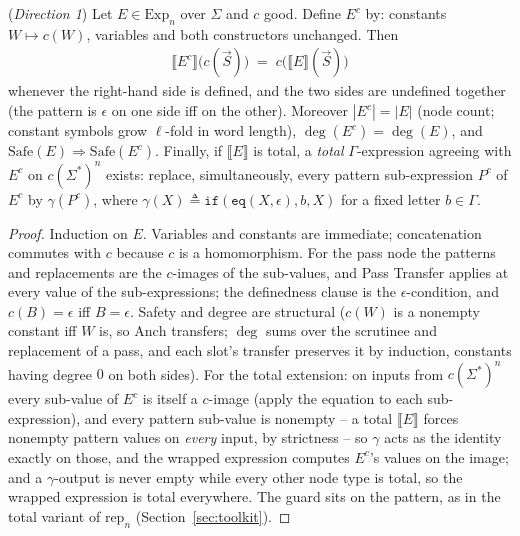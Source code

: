 \documentclass[runningheads,envcountsect]{llncs}
\begin{document}
\begin{theorem}
    (\emph{Direction 1})
    \label{thm:transfer-forward}
    Let $E \in \mathrm{Exp}_n$ over $\Sigma$ and $c$ good. Define $E^c$ by: constants $W \mapsto c(W)$, variables and both constructors unchanged. Then
    \begin{align}
        \llbracket E^c \rrbracket\big(c(\vec S)\big) \;=\; c\big(\llbracket E \rrbracket(\vec S)\big)
    \end{align}
    whenever the right-hand side is defined, and the two sides are undefined together (the pattern is $\epsilon$ on one side iff on the other). Moreover $|E^c| = |E|$ (node count; constant symbols grow $\ell$-fold in word length), $\deg(E^c) = \deg(E)$, and $\mathrm{Safe}(E) \Rightarrow \mathrm{Safe}(E^c)$. Finally, if $\llbracket E \rrbracket$ is total, a \emph{total} $\Gamma$-expression agreeing with $E^c$ on $c(\Sigma^*)^n$ exists: replace, simultaneously, every pattern sub-expression $P^c$ of $E^c$ by $\gamma(P^c)$, where $\gamma(X) \triangleq \mathtt{if}(\mathtt{eq}(X, \epsilon), b, X)$ for a fixed letter $b \in \Gamma$.
\end{theorem}

\begin{proof}
    Induction on $E$. Variables and constants are immediate; concatenation commutes with $c$ because $c$ is a homomorphism. For the pass node the patterns and replacements are the $c$-images of the sub-values, and Pass Transfer applies at every value of the sub-expressions; the definedness clause is the $\epsilon$-condition, and $c(B) = \epsilon$ iff $B = \epsilon$. Safety and degree are structural ($c(W)$ is a nonempty constant iff $W$ is, so $\mathrm{Anch}$ transfers; $\deg$ sums over the scrutinee and replacement of a pass, and each slot's transfer preserves it by induction, constants having degree $0$ on both sides). For the total extension: on inputs from $c(\Sigma^*)^n$ every sub-value of $E^c$ is itself a $c$-image (apply the equation to each sub-expression), and every pattern sub-value is nonempty -- a total $\llbracket E \rrbracket$ forces nonempty pattern values on \emph{every} input, by strictness -- so $\gamma$ acts as the identity exactly on those, and the wrapped expression computes $E^c$'s values on the image; and a $\gamma$-output is never empty while every other node type is total, so the wrapped expression is total everywhere. The guard sits on the pattern, as in the total variant of $\mathrm{rep}_n$ (Section~\ref{sec:toolkit}).
\end{proof}
\end{document}
